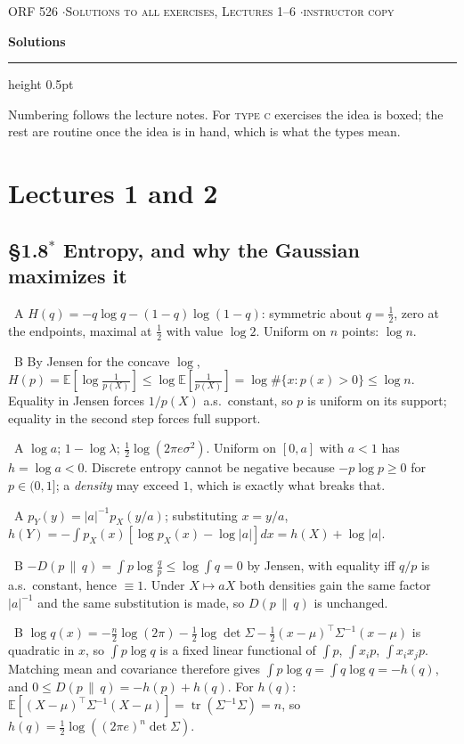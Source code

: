 \documentclass[10pt]{article}
\newcommand{\Q}[2]{\medskip\noindent{\color{acc}\textbf{#1}}\ {\scriptsize\color{grey}\textsc{#2}}\quad}
\newcommand{\E}{\mathbb{E}}
\newcommand{\Tr}{\operatorname{tr}}
\newcommand{\T}{^{\!\top}}
\newcommand{\KL}[2]{D(#1\,\|\,#2)}
\begin{document}
{\footnotesize\color{acc}\textsc{ORF 526 \quad$\cdot$\quad Solutions to all exercises, Lectures 1--6 \quad$\cdot$\quad instructor copy}}

\vspace{0.3em}
{\large\bfseries Solutions}
\vspace{0.2em}

\hrule height 0.5pt
\vspace{0.5em}

Numbering follows the lecture notes. For \textsc{type c} exercises the idea is boxed; the rest are routine once the idea is in hand, which is what the types mean.

\section{Lectures 1 and 2}
\subsection{\S1.8$^\ast$ Entropy, and why the Gaussian maximizes it}

\Q{1.13}{A} $H(q)=-q\log q-(1-q)\log(1-q)$: symmetric about $q=\tfrac12$, zero at the endpoints, maximal at $\tfrac12$ with value $\log2$. Uniform on $n$ points: $\log n$.

\Q{1.14}{B} By Jensen for the concave $\log$,
$H(p)=\E[\log\tfrac1{p(X)}]\le\log\E[\tfrac1{p(X)}]=\log\#\{x:p(x)>0\}\le\log n$.
Equality in Jensen forces $1/p(X)$ a.s.\ constant, so $p$ is uniform on its support; equality in the second step forces full support.

\Q{1.15}{A} $\log a$; $1-\log\lambda$; $\tfrac12\log(2\pi e\sigma^2)$. Uniform on $[0,a]$ with $a<1$ has $h=\log a<0$. Discrete entropy cannot be negative because $-p\log p\ge0$ for $p\in(0,1]$; a \emph{density} may exceed $1$, which is exactly what breaks that.

\Q{1.16}{A} $p_Y(y)=|a|^{-1}p_X(y/a)$; substituting $x=y/a$,
$h(Y)=-\int p_X(x)[\log p_X(x)-\log|a|]dx=h(X)+\log|a|$.

\Q{1.17}{B} $-\KL{p}{q}=\int p\log\tfrac qp\le\log\int q=0$ by Jensen, with equality iff $q/p$ is a.s.\ constant, hence $\equiv1$. Under $X\mapsto aX$ both densities gain the same factor $|a|^{-1}$ and the same substitution is made, so $\KL{p}{q}$ is unchanged.

\Q{1.18}{B} $\log q(x)=-\tfrac n2\log(2\pi)-\tfrac12\log\det\Sigma-\tfrac12(x-\mu)\T\Sigma^{-1}(x-\mu)$ is quadratic in $x$, so $\int p\log q$ is a fixed linear functional of $\int p$, $\int x_ip$, $\int x_ix_jp$. Matching mean and covariance therefore gives $\int p\log q=\int q\log q=-h(q)$, and $0\le\KL{p}{q}=-h(p)+h(q)$. For $h(q)$: $\E[(X-\mu)\T\Sigma^{-1}(X-\mu)]=\Tr(\Sigma^{-1}\Sigma)=n$, so $h(q)=\tfrac12\log((2\pi e)^n\det\Sigma)$.
\end{document}
